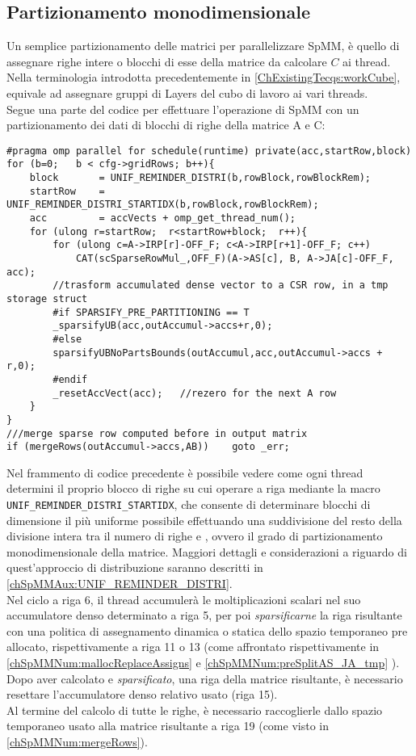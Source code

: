 \subsection{Partizionamento monodimensionale}
Un semplice partizionamento delle matrici per parallelizzare SpMM, è quello di 
assegnare righe intere o blocchi di esse della matrice da calcolare $C$ ai thread.\\
Nella terminologia introdotta precedentemente in \ref{ChExistingTecqs:workCube}, equivale ad
assegnare gruppi di Layers del cubo di lavoro ai vari threads.\\
Segue una parte del codice per effettuare l'operazione di SpMM con 
un partizionamento dei dati di blocchi di righe della matrice A e C:    \label{chSpMMNum:part1DGroup}
\begin{lstlisting}
#pragma omp parallel for schedule(runtime) private(acc,startRow,block)
for (b=0;   b < cfg->gridRows; b++){
    block		= UNIF_REMINDER_DISTRI(b,rowBlock,rowBlockRem);
    startRow	= UNIF_REMINDER_DISTRI_STARTIDX(b,rowBlock,rowBlockRem);
    acc			= accVects + omp_get_thread_num();
    for (ulong r=startRow;  r<startRow+block;  r++){
        for (ulong c=A->IRP[r]-OFF_F; c<A->IRP[r+1]-OFF_F; c++) 
            CAT(scSparseRowMul_,OFF_F)(A->AS[c], B, A->JA[c]-OFF_F, acc);
        //trasform accumulated dense vector to a CSR row, in a tmp storage struct
    	#if SPARSIFY_PRE_PARTITIONING == T
        _sparsifyUB(acc,outAccumul->accs+r,0);
        #else
        sparsifyUBNoPartsBounds(outAccumul,acc,outAccumul->accs + r,0);
        #endif
        _resetAccVect(acc);   //rezero for the next A row
    }
} 
///merge sparse row computed before in output matrix
if (mergeRows(outAccumul->accs,AB))    goto _err;
\end{lstlisting}
Nel frammento di codice precedente è possibile vedere come ogni thread determini 
il proprio blocco di righe su cui operare a riga mediante la macro \\ \verb|UNIF_REMINDER_DISTRI_STARTIDX|,
che consente di determinare blocchi di dimensione il più uniforme possibile  
effettuando una suddivisione del resto della divisione intera tra il numero di righe e ,
ovvero il grado di partizionamento monodimensionale della matrice.
Maggiori dettagli e considerazioni a riguardo di quest'approccio di distribuzione saranno
descritti in \ref{chSpMMAux:UNIF_REMINDER_DISTRI}.\\
Nel ciclo a riga 6, il thread accumulerà le moltiplicazioni scalari nel suo accumulatore denso
determinato a riga 5, per poi \emph{sparsificarne} la riga risultante con
una politica di assegnamento dinamica o statica dello spazio temporaneo pre allocato,
rispettivamente a riga 11 o 13 (come affrontato rispettivamente in 
\ref{chSpMMNum:mallocReplaceAssigns} e \ref{chSpMMNum:preSplitAS_JA_tmp} ).\\
Dopo aver calcolato e \emph{sparsificato}, una riga della matrice risultante, è 
necessario resettare l'accumulatore denso relativo usato (riga 15).\\
Al termine del calcolo di tutte le righe, è necessario raccoglierle dallo spazio temporaneo usato
alla matrice risultante a riga 19 (come visto in \ref{chSpMMNum:mergeRows}).\\


